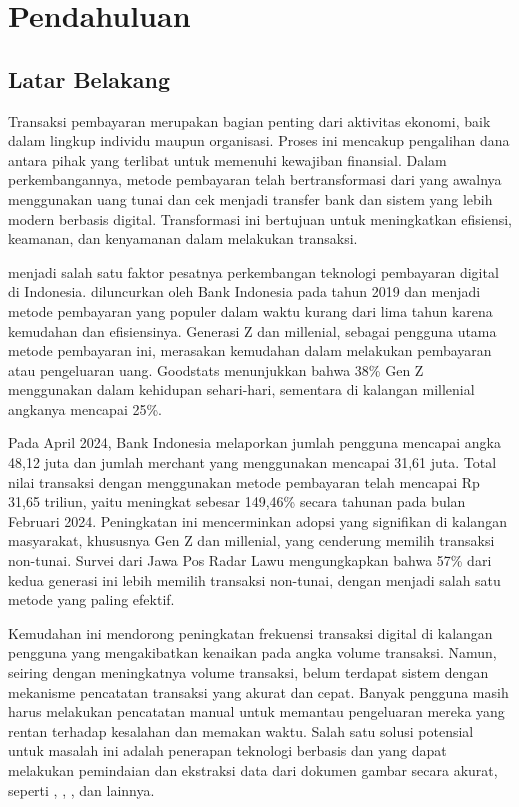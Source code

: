 \chapter{Pendahuluan}
\label{chapter:pendahuluan}

\section{Latar Belakang}
\label{sec:latarbelakang}

Transaksi pembayaran merupakan bagian penting dari aktivitas ekonomi, baik dalam lingkup individu maupun organisasi. Proses ini mencakup pengalihan dana antara pihak yang terlibat untuk memenuhi kewajiban finansial. Dalam perkembangannya, metode pembayaran telah bertransformasi dari yang awalnya menggunakan uang tunai dan cek menjadi transfer bank dan sistem yang lebih modern berbasis digital. Transformasi ini bertujuan untuk meningkatkan efisiensi, keamanan, dan kenyamanan dalam melakukan transaksi.

\qrisfull{} menjadi salah satu faktor pesatnya perkembangan teknologi pembayaran digital di Indonesia. \qris{} diluncurkan oleh Bank Indonesia pada tahun 2019 dan menjadi metode pembayaran yang populer dalam waktu kurang dari lima tahun karena kemudahan dan efisiensinya. Generasi Z dan millenial, sebagai pengguna utama metode pembayaran ini, merasakan kemudahan dalam melakukan pembayaran atau pengeluaran uang. Goodstats menunjukkan bahwa 38\% Gen Z menggunakan \qris{} dalam kehidupan sehari-hari, sementara di kalangan millenial angkanya mencapai
25\%.

Pada April 2024, Bank Indonesia melaporkan jumlah pengguna \qris{} mencapai angka 48,12 juta dan jumlah merchant yang menggunakan mencapai 31,61 juta. Total nilai transaksi dengan menggunakan metode pembayaran \qris{} telah mencapai Rp 31,65 triliun, yaitu meningkat sebesar 149,46\% secara tahunan
pada bulan Februari 2024. Peningkatan ini mencerminkan adopsi yang signifikan di kalangan masyarakat, khususnya Gen Z dan millenial, yang cenderung memilih
transaksi non-tunai. Survei dari Jawa Pos Radar Lawu mengungkapkan bahwa 57\% dari kedua generasi ini lebih memilih transaksi non-tunai, dengan \qris{} menjadi salah satu metode yang paling efektif.

\newpage

Kemudahan ini mendorong peningkatan frekuensi transaksi digital di kalangan pengguna yang mengakibatkan kenaikan pada angka volume transaksi. Namun, seiring dengan meningkatnya volume transaksi, belum terdapat sistem dengan mekanisme pencatatan transaksi yang akurat dan cepat. Banyak pengguna masih harus melakukan pencatatan manual untuk memantau pengeluaran mereka yang rentan terhadap kesalahan dan memakan waktu. Salah satu solusi potensial untuk masalah ini adalah penerapan teknologi berbasis \cvfull{} dan \dl{} yang dapat melakukan pemindaian dan ekstraksi data dari dokumen gambar secara akurat, seperti \ocrfull, \cnnfull, \transformer, dan lainnya.

